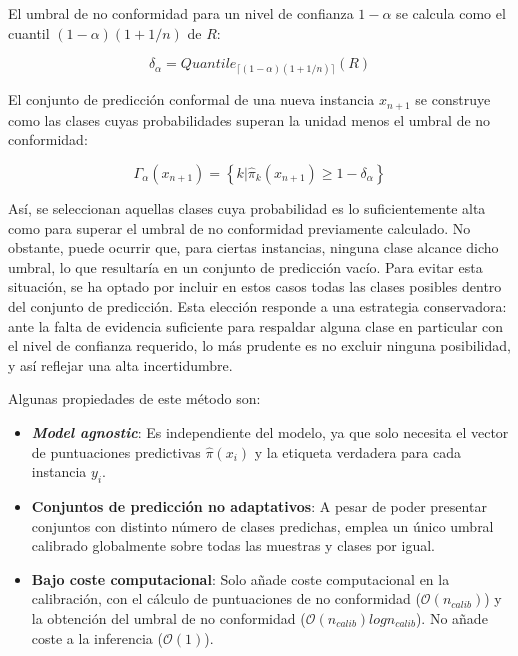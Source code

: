 El umbral de no conformidad para un nivel de confianza $1-\alpha$ se calcula como el cuantil 
$(1-\alpha)(1+1/n)$ de $R$:

$$
\delta_\alpha = Quantile_{ \lceil  (1-\alpha) (1 + 1/n)  \rceil } ( R )
$$

El conjunto de predicción conformal de una nueva instancia $x_{n+1}$ se construye como las clases cuyas 
probabilidades superan la unidad menos el umbral de no conformidad:

$$
\Gamma_\alpha(x_{n+1}) = \left\{ k | \hat{\pi}_k(x_{n+1}) \ge 1-\delta_\alpha \right\} 
$$

Así, se seleccionan aquellas clases cuya probabilidad es lo suficientemente alta como para superar el umbral 
de no conformidad previamente calculado. No obstante, puede ocurrir que, para ciertas instancias, ninguna 
clase alcance dicho umbral, lo que resultaría en un conjunto de predicción vacío. Para evitar esta situación, 
se ha optado por incluir en estos casos todas las clases posibles dentro del conjunto de predicción. Esta 
elección responde a una estrategia conservadora: ante la falta de evidencia suficiente para respaldar alguna 
clase en particular con el nivel de confianza requerido, lo más prudente es no excluir ninguna posibilidad, y
así reflejar una alta incertidumbre. 

Algunas propiedades de este método son:

\begin{itemize}

    \item \textbf{\textit{Model agnostic}}: Es independiente del modelo, ya que solo necesita el vector de 
    puntuaciones predictivas $\hat{\pi}(x_i)$ y la etiqueta verdadera para cada instancia $y_i$.  

    \item \textbf{Conjuntos de predicción no adaptativos}: A pesar de poder presentar conjuntos con distinto
    número de clases predichas, emplea un único umbral calibrado globalmente sobre todas las muestras y 
    clases por igual. 

    \item \textbf{Bajo coste computacional}: Solo añade coste computacional en la calibración, con el cálculo
    de puntuaciones de no conformidad ($\mathcal{O}(n_{calib})$) y la obtención del umbral de no conformidad
    ($\mathcal{O}(n_{calib})log n_{calib}$). No añade coste a la inferencia ($\mathcal{O}(1)$).
    
\end{itemize}

